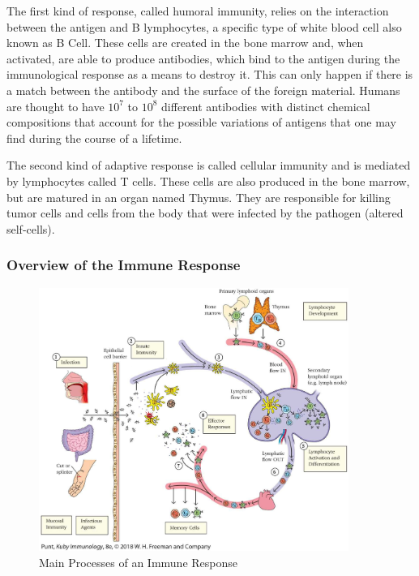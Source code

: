 The first kind of response, called humoral immunity, relies on the interaction between the antigen and B lymphocytes, a specific type of white blood cell also known as B Cell. These cells are created in the bone marrow and, when activated, are able to produce antibodies, which bind to the antigen during the immunological response as a means to destroy it. This can only happen if there is a match between the antibody and the surface of the foreign material. Humans are thought to have \(10^7\) to \(10^8\) different antibodies with distinct chemical compositions \cite{ImmuneSysAdapML1986} that account for the possible variations of antigens that one may find during the course of a lifetime.

The second kind of adaptive response is called cellular immunity and is mediated by lymphocytes called T cells. These cells are also produced in the bone marrow, but are matured in an organ named Thymus. They are responsible for killing tumor cells and cells from the body that were infected by the pathogen (altered self-cells).

\subsubsection{Overview of the Immune Response}

\begin{figure}[!h]
	\centering
	\includegraphics[width=0.9\textwidth, keepaspectratio]{img/overview_bis.png}
	\caption{Main Processes of an Immune Response~\cite{Kuby2019}}
	\label{fig:BISOverview}
\end{figure}

